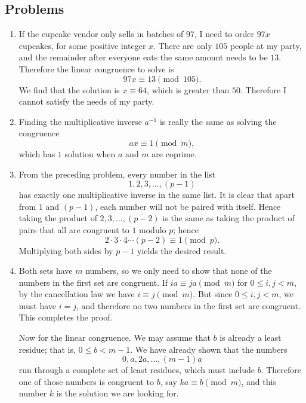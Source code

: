\documentclass[a4paper,10pt]{article}
\begin{document}
\subsection{Problems}
\begin{enumerate}
\item If the cupcake vendor only sells in batches of \(97\), I need to order
  \(97x\) cupcakes, for some positive integer \(x\). There are only \(105\)
  people at my party, and the remainder after everyone eats the same amount needs
  to be \(13\). Therefore the linear congruence to solve is \[97x\equiv13\pmod{105}.\]
  We find that the solution is \(x\equiv 64\), which is greater than \(50\). Therefore
  I cannot satisfy the needs of my party.
\item Finding the multiplicative inverse \(a^{-1}\) is really the same as solving
  the congruence \[ax\equiv 1\pmod{m},\] which has \(1\) solution when \(a\) and \(m\)
  are coprime.
\item From the preceding problem, every number in the list \[1,2,3,...,(p-1)\] has exactly
  one multiplicative inverse in the same list. It is clear that apart from \(1\) and \((p-1)\),
  each number will not be paired with itself. Hence taking the product of \(2,3,\ldots,(p-2)\) is
  the same as taking the product of pairs that all are congruent to \(1\) modulo \(p\); hence
  \[2\cdot3\cdot4\cdots(p-2)\equiv 1\pmod{p}.\]
  Multiplying both sides by \(p-1\) yields the desired result.
\item Both sets have \(m\) numbers, so we only need to show that none of the numbers in the first
  set are congruent. If \(ia\equiv ja\pmod{m}\) for \(0\le i,j<m\), by the cancellation law
  we have \(i\equiv j\pmod{m}\). But since \(0\le i,j<m\), we must have \(i=j\), and therefore
  no two numbers in the first set are congruent. This completes the proof.

  Now for the linear congruence. We may assume that \(b\) is already a least residue; that is, \(0\le b<m-1\).
  We have already shown that the numbers \[0,a,2a,\ldots,(m-1)a\] run through a complete set of
  least residues, which must include \(b\). Therefore one of those numbers is congruent to \(b\), say \(ka\equiv b\pmod{m}\),
  and this number \(k\) is the solution we are looking for.
\end{enumerate}
\end{document}
